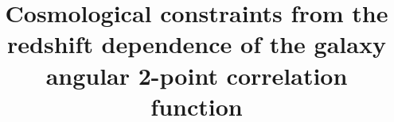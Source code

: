 \documentclass[iop]{emulateapj}
\begin{document}

\title{Cosmological constraints from the redshift dependence of %
the galaxy angular 2-point correlation function}



\end{document}

